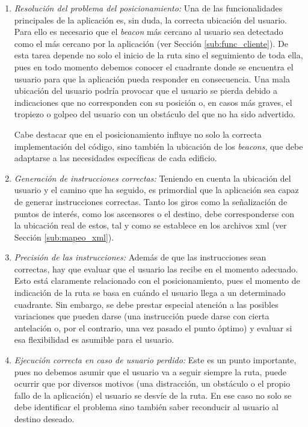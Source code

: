 \begin{enumerate}
	
	\item \textit{Resolución del problema del posicionamiento:} Una de las funcionalidades principales de la aplicación es, sin duda, la correcta ubicación del usuario. Para ello es necesario que el \textit{beacon} más cercano al usuario sea detectado como el más cercano por la aplicación (ver Sección \ref{sub:func_cliente}). De esta tarea depende no solo el inicio de la ruta sino el seguimiento de toda ella, pues en todo momento debemos conocer el cuadrante donde se encuentra el usuario para que la aplicación pueda responder en consecuencia. Una mala ubicación del usuario podría provocar que el usuario se pierda debido a indicaciones que no corresponden con su posición o, en casos más graves, el tropiezo o golpeo del usuario con un obstáculo del que no ha sido advertido.
	
	Cabe destacar que en el posicionamiento influye no solo la correcta implementación del código, sino también la ubicación de los \textit{beacons}, que debe adaptarse a las necesidades específicas de cada edificio. 
	
	\item \textit{Generación de instrucciones correctas:} Teniendo en cuenta la ubicación del usuario y el camino que ha seguido, es primordial que la aplicación sea capaz de generar instrucciones correctas. Tanto los giros como la señalización de puntos de interés, como los ascensores o el destino, debe corresponderse con la ubicación real de estos, tal y como se establece en los archivos xml (ver Sección \ref{sub:mapeo_xml}).
	
	\item \textit{Precisión de las instrucciones:} Además de que las instrucciones sean correctas, hay que evaluar que el usuario las recibe en el momento adecuado. Esto está claramente relacionado con el posicionamiento, pues el momento de indicación de la ruta se basa en cuándo el usuario llega a un determinado cuadrante. Sin embargo, se debe prestar especial atención a las posibles variaciones que pueden darse (una instrucción puede darse con cierta antelación o, por el contrario, una vez pasado el punto óptimo) y evaluar si esa flexibilidad es asumible para el usuario.
	
	\item \textit{Ejecución correcta en caso de usuario perdido:} Este es un punto importante, pues no debemos asumir que el usuario va a seguir siempre la ruta, puede ocurrir que por diversos motivos (una distracción, un obstáculo o el propio fallo de la aplicación) el usuario se desvíe de la ruta. En ese caso no solo se debe identificar el problema sino también saber reconducir al usuario al destino deseado. 
		
\end{enumerate}


